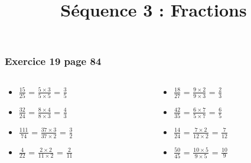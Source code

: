 \documentclass[xcolor={dvipsnames}, handout]{beamer}
\title{Séquence 3 : Fractions}
\begin{document}


	

\begin{frame}
	\frametitle{Exercice 19 page 84}
	
	\begin{columns}
		\begin{column}{0.5\textwidth}
			\begin{huge}
				\begin{itemize}
					\setlength\itemsep{1em}
					\item $\frac{15}{25}$ = \pause $\frac{5 \times 3}{5 \times 5}$ = \pause $\frac{3}{5}$\pause
					
					\item $\frac{32}{24}$ = \pause $\frac{8 \times 4}{8 \times 3}$ = \pause $\frac{4}{3}$\pause
					
					\item $\frac{111}{74}$ = \pause $\frac{37 \times 3}{37 \times 2}$ = \pause $\frac{3}{2}$\pause
					
					\item $\frac{4}{22}$ = \pause $\frac{2 \times 2}{11 \times 2}$ = \pause $\frac{2}{11}$\pause
				\end{itemize}	
			\end{huge}
					
		\end{column}
	
	
		\begin{column}{0.5\textwidth}
			\begin{huge}
				\begin{itemize}
					\setlength\itemsep{1em}
					\item $\frac{18}{27}$ = \pause $\frac{9 \times 2}{9 \times 3}$ = \pause $\frac{2}{3}$\pause
					
					\item $\frac{42}{35}$ = \pause $\frac{6 \times 7}{5 \times 7}$ = \pause $\frac{6}{5}$\pause
					
					\item $\frac{14}{24}$ = \pause $\frac{7 \times 2}{12 \times 2}$ = \pause $\frac{7}{12}$\pause
					
					\item $\frac{50}{45}$ = \pause $\frac{10 \times 5}{9 \times 5}$ = \pause $\frac{10}{9}$
				\end{itemize}	
			\end{huge}
			
		\end{column}
	\end{columns}		
	
	
\end{frame}
\end{document}

